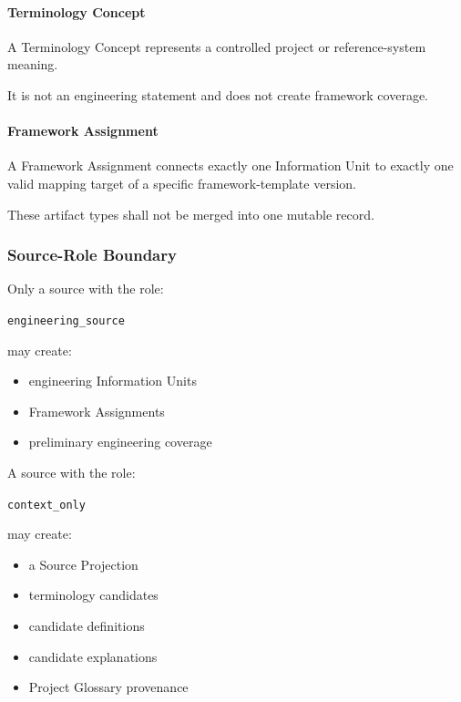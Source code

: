 \hypertarget{terminology-concept}{%
\paragraph{Terminology Concept}\label{terminology-concept}}

A Terminology Concept represents a controlled project or reference-system meaning.

It is not an engineering statement and does not create framework coverage.

\hypertarget{framework-assignment}{%
\paragraph{Framework Assignment}\label{framework-assignment}}

A Framework Assignment connects exactly one Information Unit to exactly one valid mapping target of a specific framework-template version.

These artifact types shall not be merged into one mutable record.

\hypertarget{source-role-boundary}{%
\subsubsection{Source-Role Boundary}\label{source-role-boundary}}

Only a source with the role:

\texttt{engineering\_source}

may create:

\begin{itemize}
\tightlist
\item
  engineering Information Units
\item
  Framework Assignments
\item
  preliminary engineering coverage
\end{itemize}

A source with the role:

\texttt{context\_only}

may create:

\begin{itemize}
\tightlist
\item
  a Source Projection
\item
  terminology candidates
\item
  candidate definitions
\item
  candidate explanations
\item
  Project Glossary provenance
\end{itemize}

